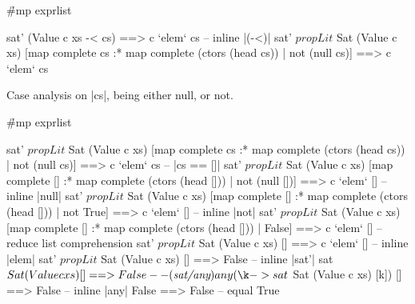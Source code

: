 \begin{code}




\h{#mp exprlist}\begin{code}
sat' (Value c xs -< cs) ==> c `elem` cs
    -- inline |(-<)|
sat' $ propLit $ Sat (Value c xs)
    [map complete cs :* map complete (ctors (head cs)) | not (null cs)] ==> c `elem` cs
\end{code}

Case analysis on |cs|, being either null, or not.

\h{#mp exprlist}\begin{code}
sat' $ propLit $ Sat (Value c xs)
    [map complete cs :* map complete (ctors (head cs)) | not (null cs)] ==> c `elem` cs
    -- |cs == []|
sat' $ propLit $ Sat (Value c xs)
    [map complete [] :* map complete (ctors (head [])) | not (null [])] ==> c `elem` []
    -- inline |null|
sat' $ propLit $ Sat (Value c xs)
    [map complete [] :* map complete (ctors (head [])) | not True] ==> c `elem` []
    -- inline |not|
sat' $ propLit $ Sat (Value c xs)
    [map complete [] :* map complete (ctors (head [])) | False] ==> c `elem` []
    -- reduce list comprehension
sat' $ propLit $ Sat (Value c xs) [] ==> c `elem` []
    -- inline |elem|
sat' $ propLit $ Sat (Value c xs) [] ==> False
    -- inline |sat'|
sat $ Sat (Value c xs) [] ==> False
    -- \lemma{sat/any}
any (\k -> sat $ Sat (Value c xs) [k]) [] ==> False
    -- inline |any|
False ==> False
    -- equal
True
\end{code}


\end{code}
